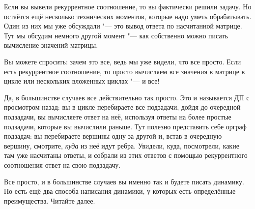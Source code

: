
Если вы вывели рекуррентное соотношение, то вы фактически решили задачу. Но остаётся ещё несколько
технических моментов, которые надо уметь обрабатывать. Один из них мы уже обсуждали "--- это вывод
ответа по насчитанной матрице. Тут мы обсудим немного другой момент "--- как собственно можно писать
вычисление значений матрицы.

Вы можете спросить: зачем это все, ведь мы уже видели, что все просто. Если есть рекуррентное
соотношение, то просто вычисляем все значения в матрице в цикле или нескольких вложенных циклах "---
и все!

Да, в большинстве случаев все действительно так просто. Это и называется ДП с просмотром назад: вы в цикле перебираете все подзадачи, дойдя до очередной подзадачи, вы вычисляете ответ на неё, используя ответы на более простые подзадачи, которые вы вычислили раньше. Тут полезно представить себе орграф подзадач: вы перебираете вершины одну за другой и, встав в очередную вершину, смотрите, \textit{куда} из неё идут ребра. Увидели, куда, посмотрели, какие там уже насчитаны ответы, и собрали из этих ответов с помощью рекуррентного соотношения ответ на свою подзадачу.

Все просто, и в большинстве случаев вы именно так и будете писать динамику. Но есть ещё два способа написания динамики, у которых есть определённые преимущества. Читайте далее.

